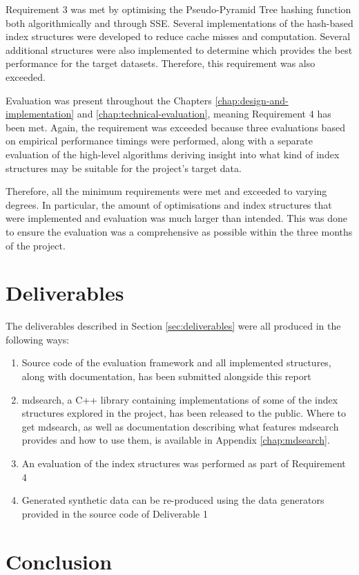 Requirement 3 was met by optimising the Pseudo-Pyramid Tree hashing function both algorithmically and through SSE. Several implementations of the hash-based index structures were developed to reduce cache misses and computation. Several additional structures were also implemented to determine which provides the best performance for the target datasets. Therefore, this requirement was also exceeded.

Evaluation was present throughout the Chapters \ref{chap:design-and-implementation} and \ref{chap:technical-evaluation}, meaning Requirement 4 has been met. Again, the requirement was exceeded because three evaluations based on empirical performance timings were performed, along with a separate evaluation of the high-level algorithms deriving insight into what kind of index structures may be suitable for the project's target data.

Therefore, all the minimum requirements were met and exceeded to varying degrees. In particular, the amount of optimisations and index structures that were implemented and evaluation was much larger than intended. This was done to ensure the evaluation was a comprehensive as possible within the three months of the project.

\section{Deliverables}

The deliverables described in Section \ref{sec:deliverables} were all produced in the following ways:
\begin{enumerate}
	\item Source code of the evaluation framework and all implemented structures, along with documentation, has been submitted alongside this report
	\item mdsearch, a C++ library containing implementations of some of the index structures explored in the project, has been released to the public. Where to get mdsearch, as well as documentation describing what features mdsearch provides and how to use them, is available in Appendix \ref{chap:mdsearch}.
	\item An evaluation of the index structures was performed as part of Requirement 4
	\item Generated synthetic data can be re-produced using the data generators provided in the source code of Deliverable 1
\end{enumerate}

\section{Conclusion}

